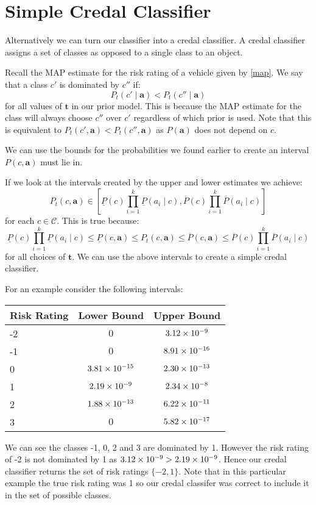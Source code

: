 \section{Simple Credal Classifier}
Alternatively we can turn our classifier into a credal classifier.
A credal classifier assigns a set of classes as opposed to a single class to an object.

Recall the MAP estimate for the risk rating of a vehicle given by \cref{map}.
We say that a class $c'$ is dominated by $c''$ if:
\begin{equation}\label{Credal Dominance}
	P_t(c' \mid \mathbf{a}) < P_t(c'' \mid \mathbf{a})
\end{equation}
for all values of $\mathbf{t}$ in our prior model.
This is because the MAP estimate for the class will always choose $c''$ over $c'$ regardless of which prior is used.
Note that this is equivalent to $P_t(c', \mathbf{a}) < P_t(c'', \mathbf{a})$ as $P(\mathbf{a})$ does not depend on $c$.

We can use the bounds for the probabilities we found earlier to create an interval $P(c, \mathbf{a})$ must lie in. 

If we look at the intervals created by the upper and lower estimates we achieve:
\begin{equation}
	P_t(c, \mathbf{a}) \in \left[ \underline{P}(c)\prod_{i=1}^k \underline{P}(a_i \mid c), \overline{P}(c)\prod_{i=1}^k \overline{P}(a_i \mid c) \right]
\end{equation}
for each $c \in \mathcal{C}$.
This is true because:
\begin{equation}
\underline{P}(c)\prod_{i=1}^k \underline{P}(a_i \mid c) \leq \underline{P}(c, \mathbf{a}) \leq P_t(c, \mathbf{a}) \leq \overline{P}(c, \mathbf{a}) \leq \overline{P}(c)\prod_{i=1}^k \overline{P}(a_i \mid c)
\end{equation}
for all choices of $\mathbf{t}$.
We can use the above intervals to create a simple credal classifier.

For an example consider the following intervals:
\begin{center}
	\begin{tabular}{l|c c}
	Risk Rating & Lower Bound & Upper Bound \\
	\hline
	-2          & $0$              & ${3.12}\times 10^{-9}$  \\
	-1          & $0$              & ${8.91}\times 10^{-16}$ \\
	0           & ${3.81}\times 10^{-15}$ & ${2.30}\times 10^{-13}$ \\
	1           & ${2.19}\times 10^{-9}$  & ${2.34}\times 10^{-8}$  \\
	2           & ${1.88}\times 10^{-13}$ & ${6.22}\times 10^{-11}$ \\
	3           & $0$              & ${5.82}\times 10^{-17}$ \\
	\end{tabular}
\end{center}
We can see the classes -1, 0, 2 and 3 are dominated by 1.
However the risk rating of -2 is not dominated by 1 as ${3.12}\times 10^{-9} > {2.19}\times 10^{-9}$.
Hence our credal classifier returns the set of risk ratings $\{-2, 1\}$.
Note that in this particular example the true risk rating was 1 so our credal classifer was correct to include it in the set of possible classes.

